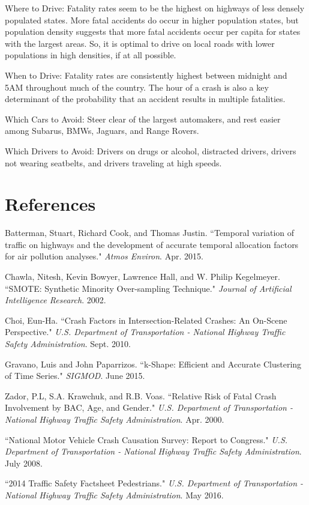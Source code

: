 \documentclass[11pt, oneside,titlepage]{article}   	%
\begin{document}
Where to Drive: Fatality rates seem to be the highest on highways of less densely populated states. More fatal accidents do occur in higher population states, but population density suggests that more fatal accidents occur per capita for states with the largest areas. So, it is optimal to drive on local roads with lower populations in high densities, if at all possible.

When to Drive: Fatality rates are consistently highest between midnight and 5AM throughout much of the country. The hour of a crash is also a key determinant of the probability that an accident results in multiple fatalities.

Which Cars to Avoid: Steer clear of the largest automakers, and rest easier among Subarus, BMWs, Jaguars, and Range Rovers.

Which Drivers to Avoid: Drivers on drugs or alcohol, distracted drivers, drivers not wearing seatbelts, and drivers traveling at high speeds.


\section*{References}
\begin{hangparas}{1.27cm}{1}
Batterman, Stuart, Richard Cook, and Thomas Justin. ``Temporal variation of traffic on highways and the development of accurate temporal allocation factors for air pollution analyses." \textit{Atmos Environ}. Apr. 2015.

Chawla, Nitesh, Kevin Bowyer, Lawrence Hall, and W. Philip Kegelmeyer. ``SMOTE: Synthetic Minority Over-sampling Technique." \textit{Journal of Artificial Intelligence Research}. 2002.

Choi, Eun-Ha. ``Crash Factors in Intersection-Related Crashes: An On-Scene Perspective." \textit{U.S. Department of Transportation - National Highway Traffic Safety Administration}. Sept. 2010.

Gravano, Luis and John Paparrizos. ``k-Shape: Efficient and Accurate Clustering of Time Series." \textit{SIGMOD}. June 2015.

Zador, P.L, S.A. Krawchuk, and R.B. Voas. ``Relative Risk of Fatal Crash Involvement by BAC, Age, and Gender." \textit{U.S. Department of Transportation - National Highway Traffic Safety Administration}. Apr. 2000.

``National Motor Vehicle Crash Causation Survey: Report to Congress." \textit{U.S. Department of Transportation - National Highway Traffic Safety Administration}. July 2008.

``2014 Traffic Safety Factsheet Pedestrians." \textit{U.S. Department of Transportation - National Highway Traffic Safety Administration}. May 2016.

\end{hangparas}
\end{document}
